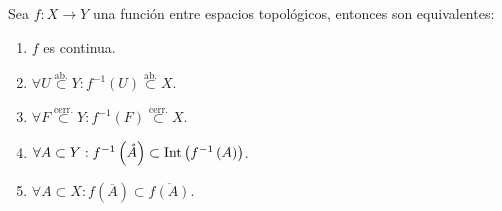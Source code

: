 \begin{prop}
Sea $f:X\rightarrow Y$ una función entre espacios topológicos, entonces son equivalentes:
\begin{enumerate}
    \item $f$ es continua.
    \item $\forall U \stackrel{\text{ab.}}{\subset} Y : f^{-1}\left( U \right) \stackrel{\text{ab.}}{\subset} X$.
    \item $\forall F \stackrel{\text{cerr.}}{\subset} Y : f^{-1}\left( F \right) \stackrel{\text{cerr.}}{\subset} X$.
    \item $\forall A \subset Y : f^{-1}\left( \mathring{A} \right) \subset \operatorname{Int}\left( f^{-1}\left( A \right) \right)$.
    \item $\forall A \subset X : f\left( \overline{A} \right) \subset \overline{f\left( A \right)}$.
\end{enumerate}
\end{prop}

